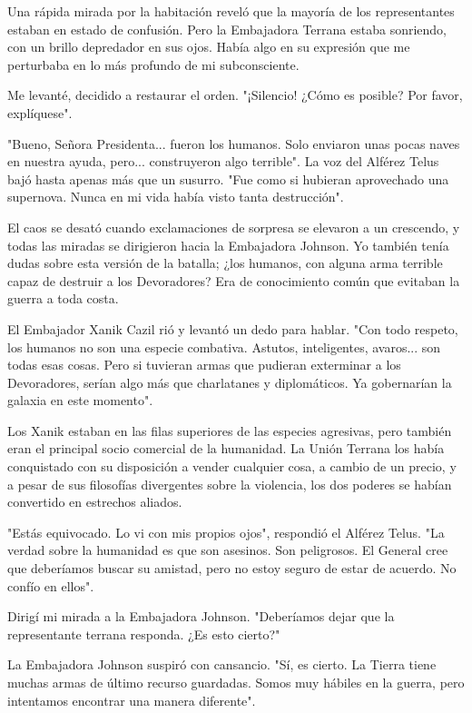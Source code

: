 \documentclass[spanish,12pt,a4paper,oneside,titlepage]{book}
\begin{document}
    Una rápida mirada por la habitación reveló que la mayoría de los representantes estaban en estado de confusión. Pero la Embajadora Terrana estaba sonriendo, con un brillo depredador en sus ojos. Había algo en su expresión que me perturbaba en lo más profundo de mi subconsciente.

    Me levanté, decidido a restaurar el orden. "¡Silencio! ¿Cómo es posible? Por favor, explíquese".

    "Bueno, Señora Presidenta... fueron los humanos. Solo enviaron unas pocas naves en nuestra ayuda, pero... construyeron algo terrible". La voz del Alférez Telus bajó hasta apenas más que un susurro. "Fue como si hubieran aprovechado una supernova. Nunca en mi vida había visto tanta destrucción".

    El caos se desató cuando exclamaciones de sorpresa se elevaron a un crescendo, y todas las miradas se dirigieron hacia la Embajadora Johnson. Yo también tenía dudas sobre esta versión de la batalla; ¿los humanos, con alguna arma terrible capaz de destruir a los Devoradores? Era de conocimiento común que evitaban la guerra a toda costa.

    El Embajador Xanik Cazil rió y levantó un dedo para hablar. "Con todo respeto, los humanos no son una especie combativa. Astutos, inteligentes, avaros... son todas esas cosas. Pero si tuvieran armas que pudieran exterminar a los Devoradores, serían algo más que charlatanes y diplomáticos. Ya gobernarían la galaxia en este momento".

    Los Xanik estaban en las filas superiores de las especies agresivas, pero también eran el principal socio comercial de la humanidad. La Unión Terrana los había conquistado con su disposición a vender cualquier cosa, a cambio de un precio, y a pesar de sus filosofías divergentes sobre la violencia, los dos poderes se habían convertido en estrechos aliados.

    "Estás equivocado. Lo vi con mis propios ojos", respondió el Alférez Telus. "La verdad sobre la humanidad es que son asesinos. Son peligrosos. El General cree que deberíamos buscar su amistad, pero no estoy seguro de estar de acuerdo. No confío en ellos".

    Dirigí mi mirada a la Embajadora Johnson. "Deberíamos dejar que la representante terrana responda. ¿Es esto cierto?"

    La Embajadora Johnson suspiró con cansancio. "Sí, es cierto. La Tierra tiene muchas armas de último recurso guardadas. Somos muy hábiles en la guerra, pero intentamos encontrar una manera diferente".
\end{document}
